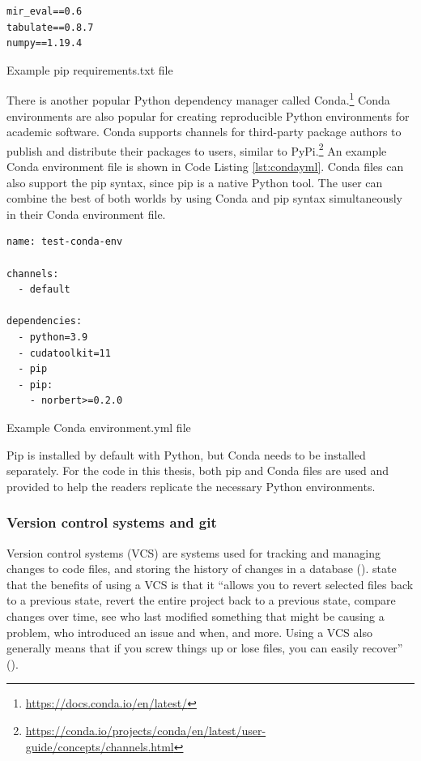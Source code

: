 \documentclass[report.tex]{subfiles}
\begin{document}
\begin{listing}[ht]
\centering
\begin{BVerbatim}
mir_eval==0.6
tabulate==0.8.7
numpy==1.19.4
\end{BVerbatim}
	\caption{Example pip requirements.txt file}
	\label{lst:reqtxt}
\end{listing}

There is another popular Python dependency manager called Conda.\footnote{\url{https://docs.conda.io/en/latest/}} Conda environments are also popular for creating reproducible Python environments for academic software. Conda supports channels for third-party package authors to publish and distribute their packages to users, similar to PyPi.\footnote{\url{https://conda.io/projects/conda/en/latest/user-guide/concepts/channels.html}} An example Conda environment file is shown in Code Listing \ref{lst:condayml}. Conda files can also support the pip syntax, since pip is a native Python tool. The user can combine the best of both worlds by using Conda and pip syntax simultaneously in their Conda environment file.

\begin{listing}[ht]
\centering
\begin{BVerbatim}
name: test-conda-env

channels:
  - default

dependencies:
  - python=3.9
  - cudatoolkit=11
  - pip
  - pip:
    - norbert>=0.2.0
\end{BVerbatim}
	\caption{Example Conda environment.yml file}
	\label{lst:condayml}
\end{listing}

Pip is installed by default with Python, but Conda needs to be installed separately. For the code in this thesis, both pip and Conda files are used and provided to help the readers replicate the necessary Python environments.

\subsubsection{Version control systems and git}

Version control systems (VCS) are systems used for tracking and managing changes to code files, and storing the history of changes in a database (\cite{gitbook}). \citeauthor{gitbook} state that the benefits of using a VCS is that it ``allows you to revert selected files back to a previous state, revert the entire project back to a previous state, compare changes over time, see who last modified something that might be causing a problem, who introduced an issue and when, and more. Using a VCS also generally means that if you screw things up or lose files, you can easily recover'' (\cite[1]{gitbook}).
\end{document}
